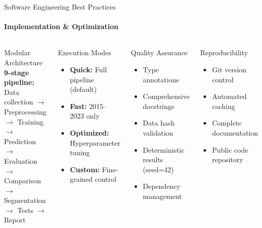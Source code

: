 \documentclass[aspectratio=169,8pt]{beamer}
\begin{document}
    \begin{frame}{Software Engineering Best Practices}
        \framesubtitle{Implementation \& Optimization}
        \begin{columns}[T]
            \begin{block}{Modular Architecture}
                \small
                \textbf{9-stage pipeline:} Data collection $\rightarrow$ Preprocessing $\rightarrow$ Training $\rightarrow$ Prediction $\rightarrow$ Evaluation $\rightarrow$ Comparison $\rightarrow$ Segmentation $\rightarrow$ Tests $\rightarrow$ Report
            \end{block}

            \vspace{0.1cm}
            \begin{exampleblock}{Execution Modes}
                \begin{itemize}
                    \item \textbf{Quick:} Full pipeline (default)
                    \item \textbf{Fast:} 2015--2023 only
                    \item \textbf{Optimized:} Hyperparameter tuning
                    \item \textbf{Custom:} Fine-grained control
                \end{itemize}
            \end{exampleblock}

            \begin{exampleblock}{Quality Assurance}
                \begin{itemize}
                    \item Type annotations
                    \item Comprehensive docstrings
                    \item Data hash validation
                    \item Deterministic results (seed=42)
                    \item Dependency management
                \end{itemize}
            \end{exampleblock}

            \vspace{0.1cm}
            \begin{exampleblock}{Reproducibility}
                \begin{itemize}
                    \item Git version control
                    \item Automated caching
                    \item Complete documentation
                    \item Public code repository
                \end{itemize}
            \end{exampleblock}
        \end{columns}
    \end{frame}
\end{document}
